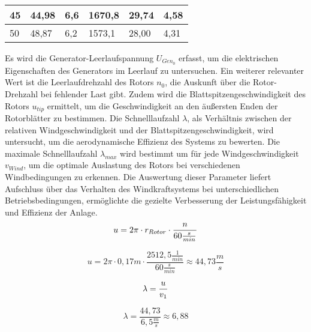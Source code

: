 \begin{table}[H]
\begin{tabular}{|l|l|l|l|l|l|}
    \rowcolor[HTML]{C6E0B4} 
    45                                    & 44,98                                  & 6,6                                                & 1670,8                                   & 29,74                                         & 4,58                                    \\ \hline
    \rowcolor[HTML]{E2EFDA} 
    50                                    & 48,87                                  & 6,2                                                & 1573,1                                   & 28,00                                         & 4,31                                    \\ \hline
    \end{tabular}
    \end{table}
\newpage
     Es wird die Generator-Leerlaufspannung $U_{Gen_0}$ erfasst, um die elektrischen Eigenschaften des Generators im Leerlauf zu untersuchen. Ein weiterer relevanter Wert ist die Leerlaufdrehzahl des Rotors $n_0$, 
     die Auskunft über die Rotor-Drehzahl bei fehlender Last gibt. Zudem wird die Blattspitzengeschwindigkeit des Rotors $u_{tip}$ ermittelt, um die Geschwindigkeit an den äußersten Enden der Rotorblätter zu bestimmen. 
     Die Schnelllaufzahl $\lambda$, als Verhältnis zwischen der relativen Windgeschwindigkeit und der Blattspitzengeschwindigkeit, wird untersucht, um die aerodynamische Effizienz des Systems zu bewerten. Die maximale
    Schnelllaufzahl $\lambda_{max}$ wird bestimmt um für jede Windgeschwindigkeit $v_{Wind}$, um die optimale Auslastung des Rotors bei verschiedenen Windbedingungen zu erkennen. Die Auswertung dieser Parameter liefert Aufschluss über das Verhalten des Windkraftsystems bei unterschiedlichen Betriebsbedingungen, ermöglichte die gezielte Verbesserung der Leistungsfähigkeit und Effizienz der Anlage.
\begin{equation}
    \centering
    u = 2 \pi \cdot r_{Rotor} \cdot \frac{n}{60 \frac{s}{min}}
    \label{eq:230615_Umfangsgeschwindigkeit}
\end{equation}

$$    u = 2 \pi \cdot 0,17m \cdot \frac{2512,5 \frac{1}{min}}{60 \frac{s}{min}}\approx 44,73\frac{m}{s} $$

\begin{equation}
    \centering
    \lambda = \frac{u}{v_1}
    \label{eq:230615_Schnelllaufzahl}
\end{equation}

$$\lambda = \frac{44,73}{6,5 \frac{m}{s}}\approx 6,88$$

